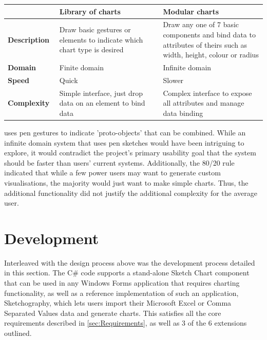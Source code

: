 	\begin{table}[h]	
	\setlength{\tabcolsep}{8pt} 
	\renewcommand{\arraystretch}{1.5}
	\begin{tabular}{p{0.2 \linewidth} | p{0.4 \linewidth} | p{0.4 \linewidth}}
	
									& 
	\bfseries Library of charts 	& 
	\bfseries Modular charts 		\\ \hline
	
	\textbf{Description} 																&
	Draw basic gestures or elements to indicate which chart type is desired 	& 
	Draw any one of 7 basic components and 
	bind data to attributes of theirs such as width, height, colour or radius
	\vspace{6 \lineskip} 	\\ \hline
	
	\textbf{Domain} 				&
	Finite domain 		& 
	Infinite domain 	\\ \hline
	
	\textbf{Speed} 				&
	Quick				& 
	Slower 				\\ \hline
	
	\textbf{Complexity}															&
	Simple interface, just drop data on an element to bind data			& 
	Complex interface to expose all attributes and manage data binding 	\\
	\end{tabular}
	\end{table}
	
	\cite{chao_poster:_2010} uses pen gestures to indicate 'proto-objects' that can be combined. While an infinite domain system that uses pen sketches would have been intriguing to explore, it would contradict the project's primary usability goal that the system should be faster than users' current systems. Additionally, the 80/20 rule indicated that while a few power users may want to generate custom visualisations, the majority would just want to make simple charts. Thus, the additional functionality did not justify the additional complexity for the average user.
	

	\section{Development}
	Interleaved with the design process above was the development process detailed in this section. The C\# code supports a stand-alone Sketch Chart component that can be used in any Windows Forms application that requires charting functionality, as well as a reference implementation of such an application, Sketchography, which lets users import their Microsoft Excel or Comma Separated Values data and generate charts. This satisfies all the core requirements described in \autoref{sec:Requirements}, as well as 3 of the 6 extensions outlined.
	
